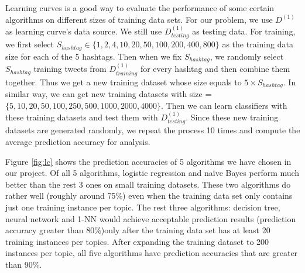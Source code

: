 \documentclass[letterpaper,11pt,twocolumn]{article}
\begin{document}
Learning curves is a good way to evaluate the performance of some certain algorithms on different sizes of training data sets. For our problem, we use $D^{(1)}$ as learning curve's data source. We still use $D_{testing}^{(1)}$ as testing data. For training, we first select $S_{hashtag} \in \{1, 2, 4, 10, 20, 50, 100, 200, 400, 800\}$ as the training data size for each of the 5 hashtags. Then when we fix $S_{hashtag}$, we randomly select $S_{hashtag}$ training tweets from $D_{training}^{(1)}$ for every hashtag and then combine them together. Thus we get a new training dataset whose size equals to $5 \times S_{hashtag}$. In similar way, we can get new training datasets with size = $\{5, 10, 20, 50, 100, 250, 500, 1000, 2000, 4000\}$. Then we can learn classifiers with these training datasets and test them with $D_{testing}^{(1)}$. Since these new training datasets are generated randomly, we repeat the process 10 times and compute the average prediction accuracy for analysis.

\begin{figure*}[!htb]
\centering
{}
\caption{Learning Curve for 5 Different Algorithms}
\label{fig:lc}
\end{figure*}

Figure \ref{fig:lc} shows the prediction accuracies of 5 algorithms we have chosen in our project. Of all 5 algorithms, logistic regression and na{\"i}ve Bayes perform much better than the rest 3 ones on small training datasets. These two algorithms do rather well (roughly around 75\%) even when the training data set only contains just one training instance per topic. The rest three algorithms: decision tree, neural network and 1-NN would achieve acceptable prediction results (prediction accuracy greater than 80\%)only after the training data set has at least 20 training instances per topics. After expanding the training dataset to 200 instances per topic, all five algorithms have prediction accuracies that are greater than 90\%. 

\begin{figure*}[!htb]
\centering
{}
\caption{Prediction Accuracies on 5 Different Labels}
\label{fig:lb}
\end{figure*}
\end{document}

